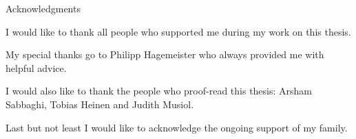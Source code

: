 \begin{center} 


\huge Acknowledgments

\end{center}
I would like to thank all people who supported me during my work on this thesis.

My special thanks go to Philipp Hagemeister who always provided me with helpful advice.

I would also like to thank the people who proof-read this thesis: Arsham Sabbaghi, Tobias Heinen and Judith Musiol.

Last but not least I would like to acknowledge the ongoing support of my family.
